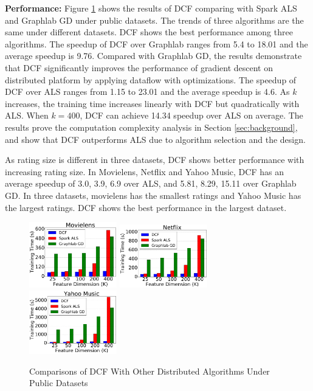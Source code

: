 \documentclass{llncs}
\begin{document}
\textbf{Performance:} Figure \ref{fig:dcfPerformance} shows the results of DCF comparing with Spark ALS and Graphlab GD under public datasets. The trends of three algorithms are the same under different datasets. DCF shows the best performance among three algorithms. The speedup of DCF over Graphlab ranges from 5.4 to 18.01 and the average speedup is 9.76. Compared with Graphlab GD, the results demonstrate that DCF significantly improves the performance of gradient descent on distributed platform by applying dataflow with optimizations. The speedup of DCF over ALS ranges from 1.15 to 23.01 and the average speedup is 4.6. As $k$ increases, the training time increases linearly with DCF but quadratically with ALS. When $k=400$, DCF can achieve 14.34 speedup over ALS on average. The results prove the computation complexity analysis in Section \ref{sec:background}, and show that DCF outperforms ALS due to algorithm selection and the design.

As rating size is different in three datasets, DCF shows better performance with increasing rating size. In Movielens, Netflix and Yahoo Music, DCF has an average speedup of 3.0, 3.9, 6.9 over ALS, and 5.81, 8.29, 15.11 over Graphlab GD. In three datasets, movielens has the smallest ratings and Yahoo Music has the largest ratings. DCF shows the best performance in the largest dataset.

\begin{figure}[!t]
\centering
\includegraphics[width=1.5in]{pics/movielens.pdf}
\includegraphics[width=1.5in]{pics/netflix.pdf}
\includegraphics[width=1.5in]{pics/yahoo.pdf}
\vspace{-10pt}
\caption{Comparisons of DCF With Other Distributed Algorithms Under Public Datasets}
\vspace{-15pt}
\label{fig:dcfPerformance}
\end{figure}
\end{document}
